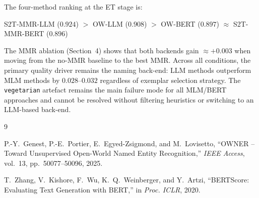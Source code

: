 \documentclass[11pt,a4paper]{article}
\begin{document}
The four-method ranking at the ET stage is:

\begin{center}
S2T-MMR-LLM ($\mathbf{0.924}$)
$>$ OW-LLM ($0.908$)
$>$ OW-BERT ($0.897$)
$\approx$ S2T-MMR-BERT ($0.896$)
\end{center}

\noindent
The MMR ablation (Section~4) shows that both backends gain
${\approx}{+}0.003$ when moving from the no-MMR baseline to the best
MMR.
Across all conditions, the primary quality driver remains the naming
back-end: LLM methods outperform MLM methods by $0.028$--$0.032$
regardless of exemplar selection strategy.
The \texttt{vegetarian} artefact remains the main failure mode for all
MLM/BERT approaches and cannot be resolved without filtering heuristics
or switching to an LLM-based back-end.

\begin{thebibliography}{9}

P.-Y.~Genest, P.-E.~Portier, E.~Egyed-Zsigmond, and M.~Lovisetto,
``OWNER -- Toward Unsupervised Open-World Named Entity Recognition,''
\textit{IEEE Access}, vol.~13, pp.~50077--50096, 2025.

T.~Zhang, V.~Kishore, F.~Wu, K.~Q.~Weinberger, and Y.~Artzi,
``BERTScore: Evaluating Text Generation with BERT,''
in \textit{Proc. ICLR}, 2020.

\end{thebibliography}
\end{document}
